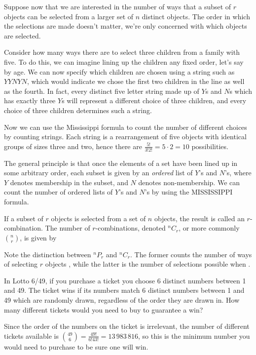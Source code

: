 Suppose now that we are interested in the number of ways that a subset of $r$ objects can be selected from a larger set of $n$ distinct objects. The order in which the selections are made doesn't matter, we're only concerned with which objects are selected.
\par
Consider how many ways there are to select three children from a family with five. To do this, we can imagine lining up the children any fixed order, let's say by age. We can now specify which children are chosen using a string such as $YYNYN$, which would indicate we chose the first two children in the line as well as the fourth. In fact, every distinct five letter string made up of $Y$s and $N$s which has exactly three $Y$s will represent a different choice of three children, and every choice of three children determines such a string.
\par
Now we can use the Mississippi formula to count the number of different choices by counting strings. Each string is a rearrangement of five objects with identical groups of sizes three and two, hence there are $\frac{5!}{3!2!} = 5 \cdot 2 = 10$ possibilities.
\par
The general principle is that once the elements of a set have been lined up in some arbitrary order, each subset is given by an \emph{ordered} list of $Y$'s and $N$'s, where $Y$ denotes membership in the subset, and $N$ denotes non-membership. We can count the number of ordered lists of $Y$'s and $N$'s by using the MISSISSIPPI formula.
\begin{defn}\label{combinationdefinition}
If a subset of $r$ objects is selected from a set of $n$ objects, the result is called an $r$-combination. The number of $r$-combinations, denoted $^nC_r$, or more commonly $\binom{n}{r}$, is given by
\end{defn}
\begin{rmk}
Note the distinction between $^nP_r$ and $^nC_r$. The former counts the number of ways of selecting $r$ objects , while the latter is the number of selections possible when .
\end{rmk}
\begin{examp}
In Lotto 6/49, if you purchase a ticket you choose 6 distinct numbers between 1 and 49. The ticket wins if its numbers match 6 distinct numbers between 1 and 49 which are randomly drawn, regardless of the order they are drawn in. How many different tickets would you need to buy to guarantee a win?
\par
\noindent Since the order of the numbers on the ticket is irrelevant, the number of different tickets available is $\binom{49}{6} = \frac{49!}{6!43!} = 13\,983\,816$, so this is the minimum number you would need to purchase to be sure one will win.
\end{examp}
